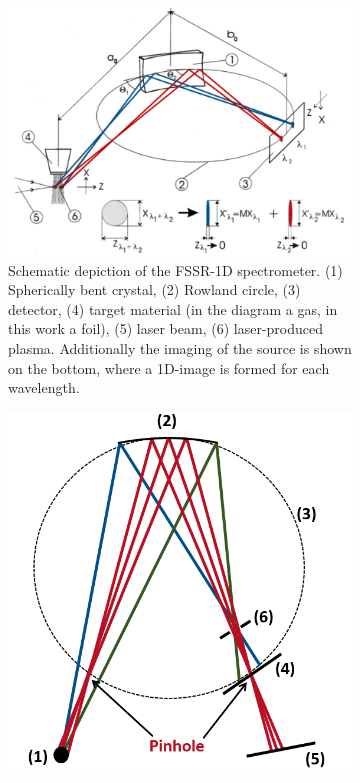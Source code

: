 \begin{figure}
	\centering
	\begin{subfigure}[t]{0.58\textwidth}
		\includegraphics[width=\textwidth]{Diagrams/3DSchematicFSSR.PNG}
		\caption{Schematic depiction of the FSSR-1D spectrometer. (1) 
		Spherically bent crystal, (2) Rowland circle, (3) detector, (4) target 
		material (in the diagram a gas, in this work a foil), 
		(5) laser beam, (6) laser-produced plasma. Additionally the 
		imaging of the source is shown on the bottom, where a 1D-image is 
		formed for each wavelength. \citep{blasco2001portable}}
		\label{3DSchematicFSSR}
	\end{subfigure}%
	\hfill
	\begin{subfigure}[t]{0.38\textwidth}
	\centering
		\includegraphics[width=\textwidth]{Diagrams/2D1DFSSR.PNG}

\end{subfigure}
\end{figure}
